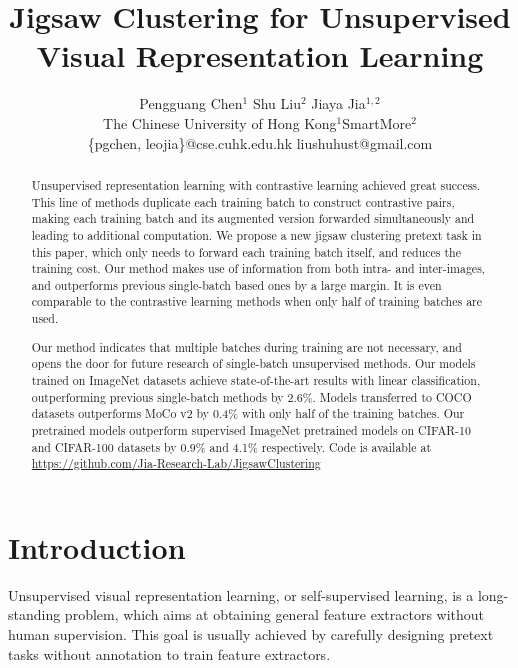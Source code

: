 \documentclass[final]{cvpr}
\begin{document}
\title{Jigsaw Clustering for Unsupervised Visual Representation Learning}

\author{Pengguang Chen$^{1}$ \quad\quad Shu Liu$^{2}$ \quad\quad Jiaya Jia$^{1,2}$  \\[0.2cm]
	The Chinese University of Hong Kong$^{1}$\quad SmartMore$^{2}$\\
	\{pgchen, leojia\}@cse.cuhk.edu.hk \quad liushuhust@gmail.com
}

\maketitle
\pagestyle{empty}
\thispagestyle{empty}


\begin{abstract}

Unsupervised representation learning with contrastive learning achieved great success. This line of methods duplicate each training batch to construct contrastive pairs, making each training batch and its augmented version forwarded simultaneously and leading to additional computation. We propose a new jigsaw clustering pretext task in this paper, which only needs to forward each training batch itself, and reduces the training cost. Our method makes use of information from both intra- and inter-images, and outperforms previous single-batch based ones by a large margin. It is even comparable to the contrastive learning methods when only half of training batches are used.
 
Our method indicates that multiple batches during training are not necessary, and opens the door for future research of single-batch unsupervised methods.
Our models trained on ImageNet datasets achieve state-of-the-art results with linear classification, outperforming previous single-batch methods by 2.6\%. Models transferred to COCO datasets outperforms MoCo v2 by 0.4\% with only half of the training batches. Our pretrained models outperform supervised ImageNet pretrained models on CIFAR-10 and CIFAR-100 datasets by 0.9\% and 4.1\% respectively. Code is available at \url{https://github.com/Jia-Research-Lab/JigsawClustering}


\end{abstract}

\section{Introduction}
Unsupervised visual representation learning, or self-supervised learning, is a long-standing problem, which aims at obtaining general feature extractors without human supervision. This goal is usually achieved by carefully designing pretext tasks without annotation to train feature extractors.
\end{document}
